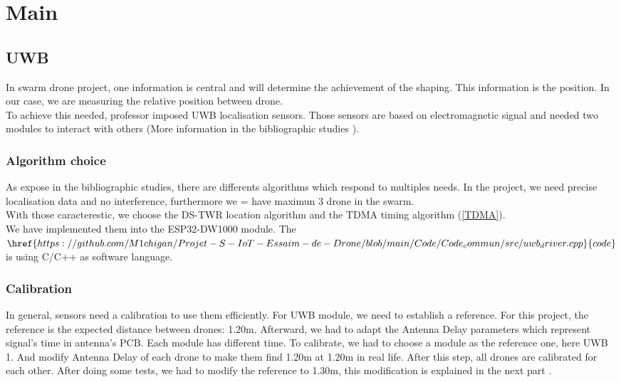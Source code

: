 \chapter{Main}

\section{UWB}
In swarm drone project, one information is central and will determine the achievement of the shaping.
This information is the position. In our case, we are measuring the relative position between drone. \\ 
To achieve this needed, professor imposed UWB localisation sensors. Those sensors are based on electromagnetic signal and needed two modules to interact with others (More information in the bibliographic studies ).

\subsection{Algorithm choice}
As expose in the bibliographic studies, there are differents algorithms which respond to multiples needs. In the project, we need precise localisation data and no interference, furthermore we = have maximun 3 drone in the swarm. \\
With those caracterestic, we choose the DS-TWR location algorithm and the TDMA timing algorithm (\ref{TDMA}). \\
We have implemented them into the ESP32-DW1000 module. The $\href{https://github.com/M1chigan/Projet-S-IoT-Essaim-de-Drone/blob/main/Code/Code_commun/src/uwb_driver.cpp}{code}$ is using C/C++ as software language. 

\subsection{Calibration}

In general, sensors need a calibration to use them efficiently. For UWB module, we need to establish a reference. For this project, the reference is the expected distance between drones: 1.20m.
Afterward, we had to adapt the Antenna Delay parameters which represent signal's time in antenna's PCB. Each module has different time. To calibrate, we had to choose a module as the reference one, here UWB 1. And modify Antenna Delay of each drone to make them find 1.20m at 1.20m in real life. 
After this step, all drones are calibrated for each other. 
After doing some tests, we had to modify the reference to 1.30m, this modification is explained in the next part .
\newpage
